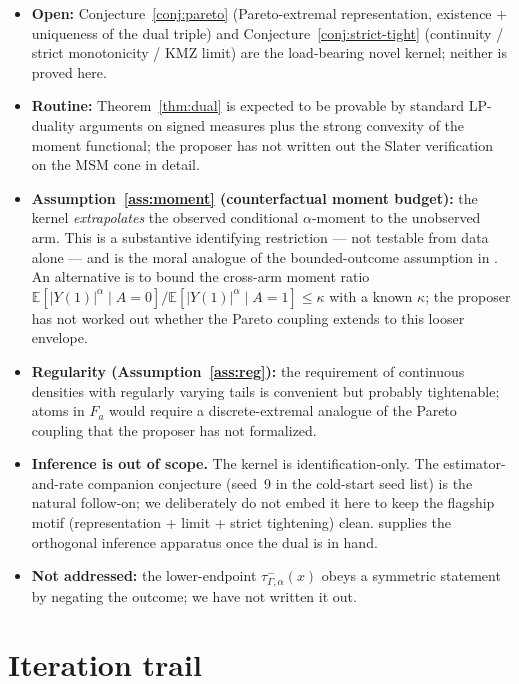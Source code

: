 \documentclass[11pt]{article}
\newcommand{\E}{\mathbb{E}}
\theoremstyle{definition}
\theoremstyle{plain}
\theoremstyle{remark}
\begin{document}
\begin{itemize}[leftmargin=1.4em,itemsep=0pt]
  \item \textbf{Open:} Conjecture~\ref{conj:pareto} (Pareto-extremal representation, existence + uniqueness of the dual triple) and Conjecture~\ref{conj:strict-tight} (continuity / strict monotonicity / KMZ limit) are the load-bearing novel kernel; neither is proved here.
  \item \textbf{Routine:} Theorem~\ref{thm:dual} is expected to be provable by standard LP-duality arguments on signed measures plus the strong convexity of the moment functional; the proposer has not written out the Slater verification on the MSM cone in detail.
  \item \textbf{Assumption~\ref{ass:moment} (counterfactual moment budget):} the kernel \emph{extrapolates} the observed conditional $\alpha$-moment to the unobserved arm. This is a substantive identifying restriction --- not testable from data alone --- and is the moral analogue of the bounded-outcome assumption in \cite{KallusMaoZhou2019CATEIntervals}. An alternative is to bound the cross-arm moment ratio $\E[|Y(1)|^\alpha\mid A=0]/\E[|Y(1)|^\alpha\mid A=1]\le \kappa$ with a known $\kappa$; the proposer has not worked out whether the Pareto coupling extends to this looser envelope.
  \item \textbf{Regularity (Assumption~\ref{ass:reg}):} the requirement of continuous densities with regularly varying tails is convenient but probably tightenable; atoms in $F_a$ would require a discrete-extremal analogue of the Pareto coupling that the proposer has not formalized.
  \item \textbf{Inference is out of scope.} The kernel is identification-only. The estimator-and-rate companion conjecture (seed~9 in the cold-start seed list) is the natural follow-on; we deliberately do not embed it here to keep the flagship motif (representation + limit + strict tightening) clean. \cite{DornGuoKallus2025DVDS} supplies the orthogonal inference apparatus once the dual is in hand.
  \item \textbf{Not addressed:} the lower-endpoint $\tau^-_{\Gamma,\alpha}(x)$ obeys a symmetric statement by negating the outcome; we have not written it out.
\end{itemize}

\section{Iteration trail}
\end{document}
